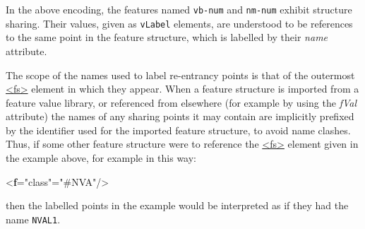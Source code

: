 In the above encoding, the features named \texttt{vb-num} and \texttt{nm-num} exhibit structure sharing. Their values, given as \texttt{vLabel} elements, are understood to be references to the same point in the feature structure, which is labelled by their {\itshape name} attribute.\par
The scope of the names used to label re-entrancy points is that of the outermost \hyperref[TEI.fs]{<fs>} element in which they appear. When a feature structure is imported from a feature value library, or referenced from elsewhere (for example by using the {\itshape fVal} attribute) the names of any sharing points it may contain are implicitly prefixed by the identifier used for the imported feature structure, to avoid name clashes. Thus, if some other feature structure were to reference the \hyperref[TEI.fs]{<fs>} element given in the example above, for example in this way: \par\bgroup{}\exampleFont \begin{shaded}\noindent\mbox{}{<\textbf{f}\hspace*{1em}{name}="{class}"\hspace*{1em}{fVal}="{\#NVA}"/>}\end{shaded}\egroup\par \noindent  then the labelled points in the example would be interpreted as if they had the name \texttt{NVAL1}.
